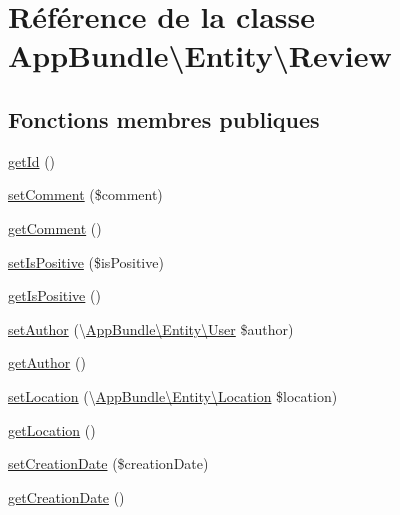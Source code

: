 \hypertarget{classAppBundle_1_1Entity_1_1Review}{}\section{Référence de la classe App\+Bundle\textbackslash{}Entity\textbackslash{}Review}
\label{classAppBundle_1_1Entity_1_1Review}
\subsection*{Fonctions membres publiques}
\begin{DoxyCompactItemize}
\item 
\hyperlink{classAppBundle_1_1Entity_1_1Review_a7831df4f53b9e884952db1d4bf1fff0c}{get\+Id} ()
\item 
\hyperlink{classAppBundle_1_1Entity_1_1Review_abb860d7311313005a3d43c7ae4f5028f}{set\+Comment} (\$comment)
\item 
\hyperlink{classAppBundle_1_1Entity_1_1Review_afcf5bbea14b6c5ab6c4176626c71351c}{get\+Comment} ()
\item 
\hyperlink{classAppBundle_1_1Entity_1_1Review_a80b99fea75d03bb7beb8abf6ed842aac}{set\+Is\+Positive} (\$is\+Positive)
\item 
\hyperlink{classAppBundle_1_1Entity_1_1Review_a731b3c2e477ff4c22d5e96c628299c7a}{get\+Is\+Positive} ()
\item 
\hyperlink{classAppBundle_1_1Entity_1_1Review_a86f0645495f1ca5aab85cfb2e2f4782b}{set\+Author} (\textbackslash{}\hyperlink{classAppBundle_1_1Entity_1_1User}{App\+Bundle\textbackslash{}\+Entity\textbackslash{}\+User} \$author)
\item 
\hyperlink{classAppBundle_1_1Entity_1_1Review_a4cd28ac8bbe58dfc98e5a65b04235d88}{get\+Author} ()
\item 
\hyperlink{classAppBundle_1_1Entity_1_1Review_a1f01ea851e2dd32bd7e4fd6d5da2657e}{set\+Location} (\textbackslash{}\hyperlink{classAppBundle_1_1Entity_1_1Location}{App\+Bundle\textbackslash{}\+Entity\textbackslash{}\+Location} \$location)
\item 
\hyperlink{classAppBundle_1_1Entity_1_1Review_a0e43af27c5317baf107c021dce387388}{get\+Location} ()
\item 
\hyperlink{classAppBundle_1_1Entity_1_1Review_a41be2d79098867b4f7cab2cac880ca5c}{set\+Creation\+Date} (\$creation\+Date)
\item 
\hyperlink{classAppBundle_1_1Entity_1_1Review_af74135765b0b130f9b1a65f5242631b4}{get\+Creation\+Date} ()
\end{DoxyCompactItemize}


